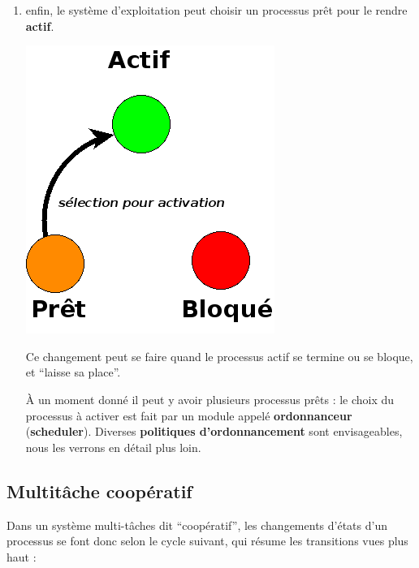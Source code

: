 \begin{multicols}{2}
\begin{enumerate}
\item enfin, le système d'exploitation peut choisir un processus prêt 
pour le rendre \textbf{actif}. 
\begin{center}
\includegraphics[width=0.7\linewidth]{Figures/pret-vers-actif.png}
\end{center}

Ce changement peut se faire quand le processus actif se termine ou se bloque, 
et ``laisse sa place''.

À un moment donné il peut y avoir plusieurs processus prêts : le choix du processus
à activer est fait par un module appelé  \textbf{ordonnanceur} (\textbf{scheduler}).
Diverses \textbf{politiques d'ordonnancement} sont envisageables, nous les verrons en 
détail plus loin.

\end{enumerate}


\subsection{Multitâche coopératif}

Dans un système multi-tâches dit ``coopératif'', les changements d'états
d'un processus se font donc selon le cycle suivant, qui résume les transitions
vues plus haut :


\end{multicols}
